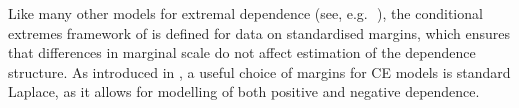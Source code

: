 \documentclass[12pt]{article}
\begin{document}
Like many other models for extremal dependence (see, e.g.\,~\citet{Davison2015}), the conditional extremes framework of \citet{Heffernan2004} is defined for data on standardised margins, which ensures that differences in marginal scale do not affect estimation of the dependence structure.
As introduced in \citet{Keef2013}, a useful choice of margins for CE models is standard Laplace, as it allows for modelling of both positive and negative dependence.
\end{document}
